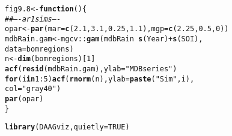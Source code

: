\documentclass[12pt, a4paper,  BCOR=8.25mm, DIV=15]{scrartcl}\usepackage[]{graphicx}\usepackage[]{color}
\makeatletter
\newcommand{\hlnum}[1]{\textcolor[rgb]{0.686,0.059,0.569}{#1}}%
\newcommand{\hlstr}[1]{\textcolor[rgb]{0.192,0.494,0.8}{#1}}%
\newcommand{\hlcom}[1]{\textcolor[rgb]{0.678,0.584,0.686}{\textit{#1}}}%
\newcommand{\hlopt}[1]{\textcolor[rgb]{0,0,0}{#1}}%
\newcommand{\hlstd}[1]{\textcolor[rgb]{0.345,0.345,0.345}{#1}}%
\newcommand{\hlkwa}[1]{\textcolor[rgb]{0.161,0.373,0.58}{\textbf{#1}}}%
\newcommand{\hlkwb}[1]{\textcolor[rgb]{0.69,0.353,0.396}{#1}}%
\newcommand{\hlkwc}[1]{\textcolor[rgb]{0.333,0.667,0.333}{#1}}%
\newcommand{\hlkwd}[1]{\textcolor[rgb]{0.737,0.353,0.396}{\textbf{#1}}}%
\newenvironment{kframe}{%
 \def\at@end@of@kframe{}%
 \ifinner\ifhmode%
  \def\at@end@of@kframe{\end{minipage}}%
  \begin{minipage}{\columnwidth}%
 \fi\fi%
 \def\FrameCommand##1{\hskip\@totalleftmargin \hskip-\fboxsep
 \colorbox{shadecolor}{##1}\hskip-\fboxsep
     \hskip-\linewidth \hskip-\@totalleftmargin \hskip\columnwidth}%
 \MakeFramed {\advance\hsize-\width
   \@totalleftmargin\z@ \linewidth\hsize
   \@setminipage}}%
 {\par\unskip\endMakeFramed%
 \at@end@of@kframe}
\newenvironment{knitrout}{}{} %
\makeatother
\begin{document}
\begin{knitrout}
\color{fgcolor}\begin{kframe}
\begin{alltt}
\hlstd{fig9.8} \hlkwb{<-} \hlkwa{function}\hlstd{()\{}
\hlcom{## ---- ar1sims ----}
\hlstd{opar} \hlkwb{<-} \hlkwd{par}\hlstd{(}\hlkwc{mar}\hlstd{=}\hlkwd{c}\hlstd{(}\hlnum{2.1}\hlstd{,} \hlnum{3.1}\hlstd{,} \hlnum{0.25}\hlstd{,} \hlnum{1.1}\hlstd{),} \hlkwc{mgp}\hlstd{=}\hlkwd{c}\hlstd{(}\hlnum{2.25}\hlstd{,}\hlnum{0.5}\hlstd{,}\hlnum{0}\hlstd{))}
\hlstd{mdbRain.gam} \hlkwb{<-} \hlstd{mgcv}\hlopt{::}\hlkwd{gam}\hlstd{(mdbRain} \hlopt{~} \hlkwd{s}\hlstd{(Year)} \hlopt{+} \hlkwd{s}\hlstd{(SOI),}
                         \hlkwc{data}\hlstd{=bomregions)}
\hlstd{n} \hlkwb{<-}  \hlkwd{dim}\hlstd{(bomregions)[}\hlnum{1}\hlstd{]}
\hlkwd{acf}\hlstd{(}\hlkwd{resid}\hlstd{(mdbRain.gam),} \hlkwc{ylab}\hlstd{=}\hlstr{"MDB series"}\hlstd{)}
\hlkwa{for}\hlstd{(i} \hlkwa{in} \hlnum{1}\hlopt{:}\hlnum{5}\hlstd{)}\hlkwd{acf}\hlstd{(}\hlkwd{rnorm}\hlstd{(n),} \hlkwc{ylab}\hlstd{=}\hlkwd{paste}\hlstd{(}\hlstr{"Sim"}\hlstd{,i),}
                 \hlkwc{col}\hlstd{=}\hlstr{"gray40"}\hlstd{)}
\hlkwd{par}\hlstd{(opar)}
\hlstd{\}}
\end{alltt}
\end{kframe}
\end{knitrout}

\begin{knitrout}
\color{fgcolor}\begin{kframe}
\begin{alltt}
\hlkwd{library}\hlstd{(DAAGviz,} \hlkwc{quietly} \hlstd{=} \hlnum{TRUE}\hlstd{)}
\end{alltt}
\end{kframe}
\end{knitrout}
\end{document}

